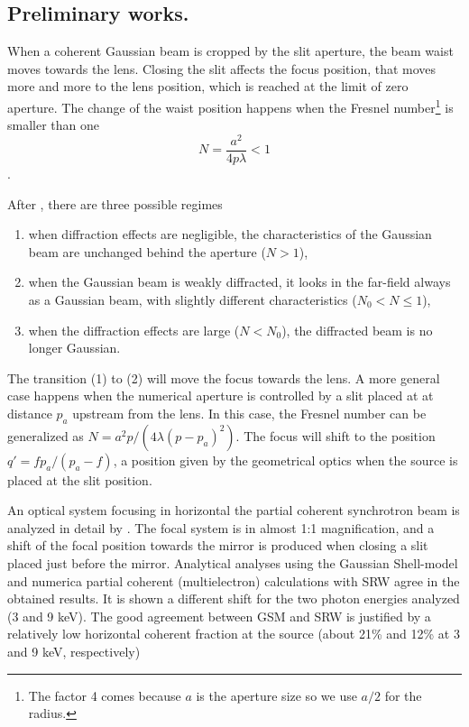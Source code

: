 \documentclass{iucr}              %
\begin{document}
\subsection{Preliminary works.}

When a coherent Gaussian beam is cropped by the slit aperture, the beam waist moves towards the lens. Closing the slit affects the focus position, that moves more and more to the lens position, which is reached at the limit of zero aperture. The change of the waist position happens when the Fresnel number\footnote{The factor 4 comes because $a$ is the aperture size so we use $a/2$ for the radius.} is smaller than one
\begin{equation}
    N = \frac{a^2}{4 p \lambda}  < 1
\end{equation}. 

After \cite{Belland:82}, there are three possible regimes 
\begin{enumerate}
\item when diffraction effects are negligible, the
characteristics of the Gaussian beam are unchanged
behind the aperture ($N>1$),
\item when the Gaussian
beam is weakly diffracted, it looks in the far-field always as a Gaussian beam, with slightly different characteristics ($N_0<N \le 1$),
\item when the diffraction effects are large ($N<N_0$),
the diffracted beam is no longer Gaussian.
\end{enumerate}

The transition (1) to (2) will move the focus towards the lens. A more general case happens when the numerical aperture is controlled by a slit placed at at distance $p_a$ upstream from the lens. 
In this case, the Fresnel number can be generalized as $N=a^2 p / (4 \lambda (p-p_a)^2)$. The focus will shift to the position $q'=f p_a/(p_a-f)$, a position given by the geometrical optics when the source is placed at the slit position. 

An optical system focusing in horizontal the partial coherent synchrotron beam is analyzed in detail by \cite{westfahl}. The focal system is in almost 1:1 magnification, and a shift of the focal position towards the mirror is produced when closing a slit placed just before the mirror. Analytical analyses using the Gaussian Shell-model and numerica partial coherent (multielectron) calculations with SRW \cite{codeSRW} agree in the obtained results. It is shown a different shift for the two photon energies analyzed (3 and 9 keV). The good agreement between GSM and SRW is justified by a relatively low horizontal coherent fraction at the source (about 21\% and 12\% at 3 and 9 keV, respectively)
 
\end{document}
